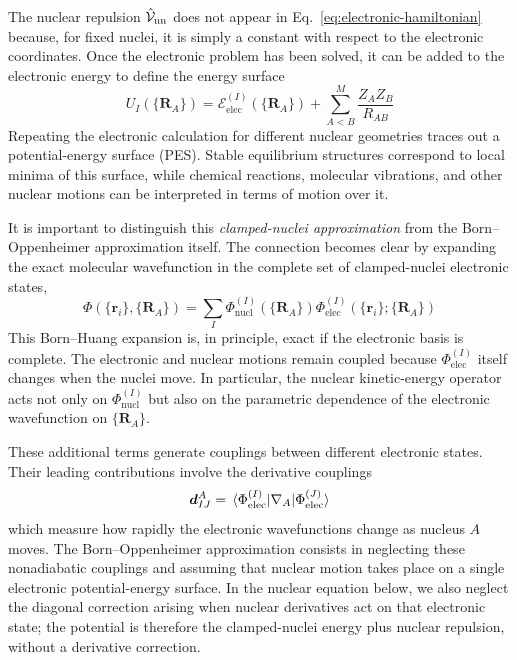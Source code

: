 \documentclass[11pt,a4paper,titlepage]{article}
\numberwithin{equation}{section}
\newcommand{\bd}{\boldsymbol{d}}
\newcommand{\br}{\boldsymbol{r}}
\newcommand{\bR}{\boldsymbol{R}}
\newcommand{\chV}{\Hat{\mathcal{V}}}
\newcommand{\cE}{\mathcal{E}}
\begin{document}
The nuclear repulsion $\chV_\text{nn}$ does not appear in
Eq.~\eqref{eq:electronic-hamiltonian} because, for fixed nuclei, it is simply
a constant with respect to the electronic coordinates. Once the electronic
problem has been solved, it can be added to the electronic energy to define
the energy surface
\begin{equation}
  U_I(\{\bR_A\})
  =
  \cE_\text{elec}^{(I)}(\{\bR_A\})
  +
  \sum_{A<B}^{M}
  \frac{Z_A Z_B}{R_{AB}}
  \label{eq:potential-energy-surface}
\end{equation}
Repeating the electronic calculation for different nuclear geometries traces
out a potential-energy surface (PES). Stable equilibrium structures correspond
to local minima of this surface, while chemical reactions, molecular
vibrations, and other nuclear motions can be interpreted in terms of motion
over it.

It is important to distinguish this \emph{clamped-nuclei approximation} from
the Born--Oppenheimer approximation itself. The connection becomes clear by
expanding the exact molecular wavefunction in the complete set of
clamped-nuclei electronic states,
\begin{equation}
  \Phi(\{\br_i\},\{\bR_A\})
  =
  \sum_I
  \Phi_\text{nucl}^{(I)}(\{\bR_A\})
  \Phi_\text{elec}^{(I)}
  (\{\br_i\};\{\bR_A\})
  \label{eq:born-huang-expansion}
\end{equation}
This Born--Huang expansion is, in principle, exact if the electronic basis is
complete. The electronic and nuclear motions remain coupled because
$\Phi_\text{elec}^{(I)}$ itself changes when the nuclei move. In particular,
the nuclear kinetic-energy operator acts not only on
$\Phi_\text{nucl}^{(I)}$ but also on the parametric dependence of the
electronic wavefunction on $\{\bR_A\}$.

These additional terms generate couplings between different electronic
states. Their leading contributions involve the derivative couplings
\begin{equation}
  \bd_{IJ}^{A}
  =
  \mel*{
    \Phi_\text{elec}^{(I)}
  }{
    \nabla_A
  }{
    \Phi_\text{elec}^{(J)}
  }
  \label{eq:nonadiabatic-coupling}
\end{equation}
which measure how rapidly the electronic wavefunctions change as nucleus $A$
moves. The Born--Oppenheimer approximation consists in neglecting these
nonadiabatic couplings and assuming that nuclear motion takes place on a
single electronic potential-energy surface. In the nuclear equation below,
we also neglect the diagonal correction arising when nuclear derivatives
act on that electronic state; the potential is therefore the clamped-nuclei
energy plus nuclear repulsion, without a derivative correction.
\end{document}
